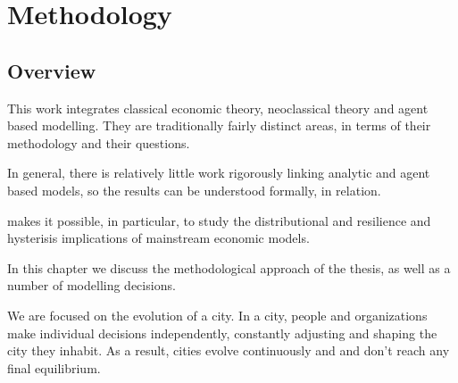 \chapter{Methodology} \label{chapter-methodology}


\section{Overview}

This work %
integrates classical economic theory, neoclassical theory and agent based modelling.
They are traditionally fairly distinct areas, in terms of their methodology and their questions. 

In general, there is relatively little work rigorously linking analytic and agent based models, so the results can be understood formally, in relation. %


makes it possible, in particular, to study the distributional and resilience and hysterisis implications of mainstream economic models.








In this chapter we discuss the methodological approach of the thesis, as well as a number of modelling decisions. 


We are focused on the evolution of a city. In a city, people and organizations make individual decisions independently, constantly adjusting and shaping the city they inhabit. As a result, cities evolve continuously and and don't reach any final equilibrium. 


